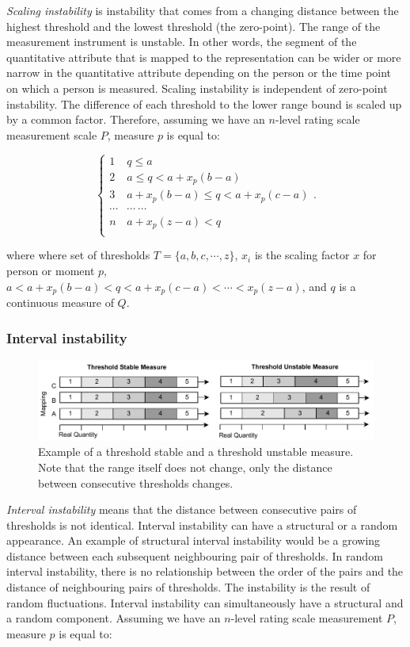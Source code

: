 \documentclass[titlepage, a4paper, 11pt]{article}
\begin{document}
\textit{Scaling instability} is instability that comes from a changing distance between the highest threshold and the lowest threshold (the zero-point). The range of the measurement instrument is unstable. In other words, the segment of the quantitative attribute that is mapped to the representation can be wider or more narrow in the quantitative attribute depending on the person or the time point on which a person is measured. Scaling instability is independent of zero-point instability. The difference of each threshold to the lower range bound is scaled up by a common factor. Therefore, assuming we have an $n$-level rating scale measurement scale $P$, measure $p$ is equal to:

\[
\begin{cases} 
    1 & q \leq a\\
    2 & a \leq q < a + x_{p}(b - a)\\
    3 & a + x_{p}(b - a) \leq q < a + x_{p}(c - a)\\
    \cdots & \cdots \ \cdots\\
    n & a + x_{p}(z - a) < q\\
\end{cases}.
\]

where where set of thresholds $T = \{a, b, c, \cdots, z\}$, $x_{i}$ is the scaling factor $x$ for person or moment $p$, $a < a + x_{p}(b - a) < q < a + x_{p}(c - a) < \cdots < x_{p}(z - a)$, and $q$ is a continuous measure of $Q$.

\subsubsection{Interval instability}

\begin{figure}
  \centering
  \includegraphics[width=\columnwidth]{Plots/threshold_instability.pdf}
  \caption{Example of a threshold stable and a threshold unstable measure. Note that the range itself does not change, only the distance between consecutive thresholds changes.}
  \label{fig:diagram_three}
\end{figure}

\textit{Interval instability} means that the distance between consecutive pairs of thresholds is not identical. Interval instability can have a structural or a random appearance. An example of structural interval instability would be a growing distance between each subsequent neighbouring pair of thresholds. In random interval instability, there is no relationship between the order of the pairs and the distance of neighbouring pairs of thresholds. The instability is the result of random fluctuations. Interval instability can simultaneously have a structural and a random component. Assuming we have an $n$-level rating scale measurement $P$, measure $p$ is equal to:
\end{document}

